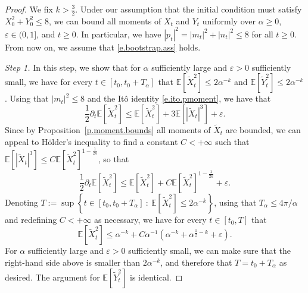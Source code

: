 \documentclass[10pt,a4paper]{amsart}
\newcommand{\E}{\mathbb E}
\newcommand{\Ll}{\left}
\newcommand{\Rr}{\right}
\newcommand{\al}{\alpha}
\newcommand{\dr}{\partial}
\newcommand{\eps}{\varepsilon}
\newcommand{\ep}{\varepsilon}
\newcommand{\td}{\widetilde}
\renewcommand{\ge}{\geqslant}
\renewcommand{\le}{\leqslant}
\begin{document}
\begin{proof}
We fix $k > \frac 3 2$. Under our assumption that the initial condition must satisfy $X_0^2 + Y_0^2 \le 8$, we can bound all moments of $X_t$ and $Y_t$ uniformly over $\alpha \ge 0$, $\ep \in (0,1]$, and $t \ge 0$. In particular, we have $|p_t|^2 = |m_t|^2 + |n_t|^2 \le 8$ for all $t \ge 0$. From now on, we assume that \eqref{e.bootstrap.ass} holds. 

\medskip

\noindent \emph{Step 1.} In this step, we show that for $\alpha$ sufficiently large and $\eps > 0$ sufficiently small, we have for every $t \in [t_0, t_0 + T_\al]$ that $\E[\td X_t^2] \le 2\al^{-k}$ and $\E[\td Y_t^2] \le 2\al^{-k}$. Using that $|m_t|^2 \le 8$ and the It\^o identity \eqref{e.ito.pmoment}, we have that
\begin{equation*}  %
\frac 1 2 \dr_t \E[\td X_t^2] \le  \E[\td X_t^2] + 3 \E[|\td X_t|^3] + \ep.
\end{equation*}
Since by Proposition~\ref{p.moment.bounds} all moments of $\td X_t$ are bounded, we can appeal to H\"older's inequality to find a constant $C < +\infty$ such that $\E[|\td X_t|^3] \le C \E[\td X_t^2]^{1- \frac 1 {2k}}$, so that
\begin{equation}  
\label{e.drX2.crude.bound}
\frac 1 2 \dr_t \E[\td X_t^2] \le  \E[\td X_t^2] + C \E[\td X_t^2]^{1-\frac 1 {2k}} + \ep.
\end{equation}
Denoting $T := \sup \Ll\{ t \in [t_0, t_0 + T_\al] \ : \  \E[\td X_t^2] \le 2 \al^{-k} \Rr\}$, using that $T_\al \le 4\pi/\al$ and redefining $C < +\infty$ as necessary, we have for every $t \in [t_0, T]$ that 
\begin{equation*}  %
\E[\td X_t^2] \le \al^{-k} + C \al^{-1} \Ll( \al^{-k} + \al^{\frac 1 2 - k} + \ep \Rr)  .
\end{equation*}
For $\alpha$ sufficiently large and $\ep > 0$ sufficiently small, we can make sure that the right-hand side above is smaller than $2\al^{-k}$, and therefore that $T = t_0 + T_\alpha$ as desired. The argument for $\E[\td Y_t^2]$ is identical. 

\medskip


\end{proof}
\end{document}

